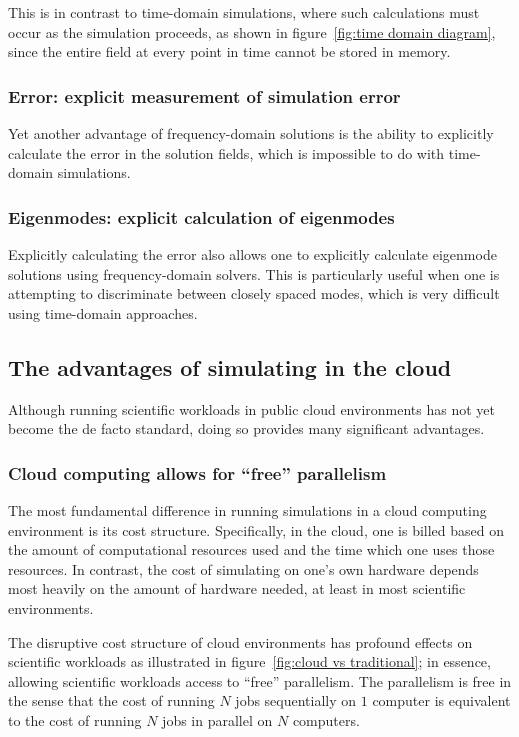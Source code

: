 \documentclass{article}
\newcommand{\fig}[1]{figure~\ref{fig:#1}}
\begin{document}
This is in contrast to time-domain simulations,
    where such calculations must occur as the simulation proceeds, 
    as shown in \fig{time domain diagram},
    since the entire field at every point in time cannot be stored in memory.

\subsubsection{Error: explicit measurement of simulation error}
Yet another advantage of frequency-domain solutions is the ability
    to explicitly calculate the error in the solution fields,
    which is impossible to do with time-domain simulations.

\subsubsection{Eigenmodes: explicit calculation of eigenmodes}
Explicitly calculating the error also allows one 
    to explicitly calculate eigenmode solutions
    using frequency-domain solvers.
This is particularly useful when one is attempting to
    discriminate between closely spaced modes,
    which is very difficult using time-domain approaches.

\subsection{The advantages of simulating in the cloud}
Although running scientific workloads in public cloud environments
    has not yet become the de facto standard,
    doing so provides many significant advantages.

\subsubsection{Cloud computing allows for ``free'' parallelism}
The most fundamental difference in running simulations
    in a cloud computing environment is its cost structure.
Specifically, in the cloud, 
    one is billed based on the amount of computational resources used
    and the time which one uses those resources.
In contrast, the cost of simulating on one's own hardware
    depends most heavily on the amount of hardware needed,
    at least in most scientific environments.

The disruptive cost structure of cloud environments 
    has profound effects on scientific workloads 
    as illustrated in \fig{cloud vs traditional};
    in essence, allowing scientific workloads access
    to ``free'' parallelism.
The parallelism is free in the sense that 
    the cost of running $N$ jobs sequentially on $1$ computer is equivalent to 
    the cost of running $N$ jobs in parallel on $N$ computers.
\end{document}

